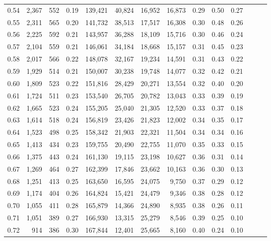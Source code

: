 \begin{tabular}{rrrrrrrrrrrrrr}
0.54 &  2,367 &  552 &  0.19 &  139,421 &   40,824 &  16,952 &  16,873 &  0.29 &  0.50 &      0.27 \\
0.55 &  2,311 &  565 &  0.20 &  141,732 &   38,513 &  17,517 &  16,308 &  0.30 &  0.48 &      0.26 \\
0.56 &  2,225 &  592 &  0.21 &  143,957 &   36,288 &  18,109 &  15,716 &  0.30 &  0.46 &      0.24 \\
0.57 &  2,104 &  559 &  0.21 &  146,061 &   34,184 &  18,668 &  15,157 &  0.31 &  0.45 &      0.23 \\
0.58 &  2,017 &  566 &  0.22 &  148,078 &   32,167 &  19,234 &  14,591 &  0.31 &  0.43 &      0.22 \\
0.59 &  1,929 &  514 &  0.21 &  150,007 &   30,238 &  19,748 &  14,077 &  0.32 &  0.42 &      0.21 \\
0.60 &  1,809 &  523 &  0.22 &  151,816 &   28,429 &  20,271 &  13,554 &  0.32 &  0.40 &      0.20 \\
0.61 &  1,724 &  511 &  0.23 &  153,540 &   26,705 &  20,782 &  13,043 &  0.33 &  0.39 &      0.19 \\
0.62 &  1,665 &  523 &  0.24 &  155,205 &   25,040 &  21,305 &  12,520 &  0.33 &  0.37 &      0.18 \\
0.63 &  1,614 &  518 &  0.24 &  156,819 &   23,426 &  21,823 &  12,002 &  0.34 &  0.35 &      0.17 \\
0.64 &  1,523 &  498 &  0.25 &  158,342 &   21,903 &  22,321 &  11,504 &  0.34 &  0.34 &      0.16 \\
0.65 &  1,413 &  434 &  0.23 &  159,755 &   20,490 &  22,755 &  11,070 &  0.35 &  0.33 &      0.15 \\
0.66 &  1,375 &  443 &  0.24 &  161,130 &   19,115 &  23,198 &  10,627 &  0.36 &  0.31 &      0.14 \\
0.67 &  1,269 &  464 &  0.27 &  162,399 &   17,846 &  23,662 &  10,163 &  0.36 &  0.30 &      0.13 \\
0.68 &  1,251 &  413 &  0.25 &  163,650 &   16,595 &  24,075 &   9,750 &  0.37 &  0.29 &      0.12 \\
0.69 &  1,174 &  404 &  0.26 &  164,824 &   15,421 &  24,479 &   9,346 &  0.38 &  0.28 &      0.12 \\
0.70 &  1,055 &  411 &  0.28 &  165,879 &   14,366 &  24,890 &   8,935 &  0.38 &  0.26 &      0.11 \\
0.71 &  1,051 &  389 &  0.27 &  166,930 &   13,315 &  25,279 &   8,546 &  0.39 &  0.25 &      0.10 \\
0.72 &    914 &  386 &  0.30 &  167,844 &   12,401 &  25,665 &   8,160 &  0.40 &  0.24 &      0.10 \\

\end{tabular}
